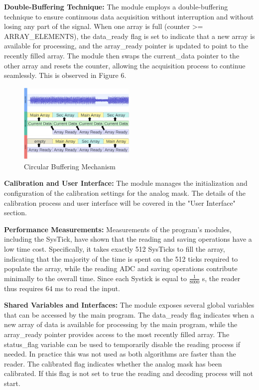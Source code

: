 \documentclass{cce2014-design}
\begin{document}
{{	  \textbf{Double-Buffering Technique:}
	  The module employs a double-buffering technique to ensure
	  continuous data acquisition without interruption and without losing
	  any part of
	  the signal. When one array is full (counter >= ARRAY\_ELEMENTS), the
	  data\_ready flag is set to indicate that a new array is available for
	  processing, and the array\_ready pointer is updated to point to the
	  recently
	  filled array. The module then swaps the current\_data pointer to the
	  other
	  array and resets the counter, allowing the acquisition process to
	  continue
	  seamlessly. This is observed in Figure 6.

	  \begin{figure}[H]
		  \centering

		  \includegraphics[width=0.5\textwidth]{circular-buffering}
		  \caption{Circular Buffering Mechanism}
		  \label{fig : Circular Buffering}
	  \end{figure}

	  \textbf{Calibration and User Interface:}
	  The module manages the initialization and configuration of the
	  calibration settings for the analog mask. The details of the
	  calibration
	  process and user interface will be covered in the "User Interface"
	  section.

	  \textbf{Performance Measurements:}
	  Measurements of the program's modules, including the SysTick, have shown that the reading and saving operations have a low time cost.
	  Specifically, it takes exactly 512 SysTicks to fill the array, indicating that the majority of the time is spent on the 512 ticks required to populate the array, while the reading ADC and saving operations contribute minimally to the overall time.
	  Since each Systick is equal to $\frac{1}{8000}$ s, the reader thus requires 64 ms to read the input.

	  \textbf{Shared Variables and Interfaces:}
	  The module exposes several global variables that can be
	  accessed by the main program. The data\_ready flag indicates when a
	  new array
	  of data is available for processing by the main program, while the
	  array\_ready
	  pointer provides access to the most recently filled array. The
	  status\_flag
	  variable can be used to temporarily disable the reading process if
	  needed. In practice this was not used as both algorithms are faster
	  than the reader.
	  The calibrated flag indicates whether the analog mask has been
	  calibrated. If this flag is not set to true the reading and decoding
	  process will not start.
  }
}
\end{document}
